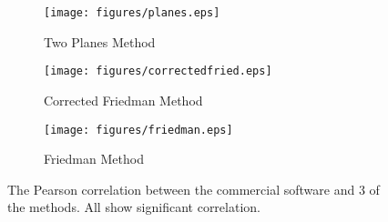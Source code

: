 \begin{figure}
	\begin{center}
		\begin{subfigure}[b]{0.30\linewidth}
			\texttt{[image: figures/planes.eps]}
			\caption{Two Planes Method}
		\end{subfigure}
		\begin{subfigure}[b]{0.30\linewidth}
			\texttt{[image: figures/correctedfried.eps]}
			\caption{Corrected Friedman Method}
		\end{subfigure}
		\begin{subfigure}[b]{0.30\linewidth}
			\texttt{[image: figures/friedman.eps]}
			\caption{Friedman Method}
		\end{subfigure}
		\caption{\label{fig:correl}The Pearson correlation between the commercial software and 3 of the methods. All show significant correlation.}
	\end{center}
\end{figure}
